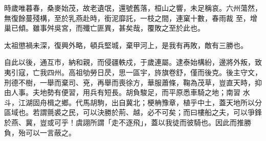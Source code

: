 \begin{pinyinscope}
 時歲唯暮春，桑麥始茂，故老遺氓，還號舊落，桓山之響，未足稱哀。六州蕩然，無復餘蔓殘構，至於乳燕赴時，銜泥靡託，一枝之間，連窠十數，春雨裁
 至，增巢已傾。雖事舛吳宮，而殲亡匪異，甚矣哉，覆敗之至於此也。



 太祖懲禍未深，復興外略，頓兵堅城，棄甲河上，是我有再敗，敵有三勝也。



 自此以後，通互市，納和親，而侵疆軼戍，于歲連屬。逮泰始構紛，邊將外叛，致夷引寇，亡我四州。高祖劬勞日昃，思一區宇，旍旗卷舒，僅而後克。後主守文，刑德不樹，一舉而棄司、兗，再舉而喪徐方，華服蕭條，鞠為茂草，豈直天時，抑由人事。夫地勢有便習，用兵有短長。胡負駿足，而平原悉車騎之地；南習
 水斗，江湖固舟楫之鄉。代馬胡駒，出自冀北；梗柟豫章，植乎中土，蓋天地所以分區域也。若謂氈裘之民，可以決勝於荊、越，必不可矣；而曰樓船之夫，可以爭鋒於燕、冀，豈或可乎！虞詡所謂「走不逐飛」，蓋以我徒而彼騎也。因此而推勝負，殆可以一言蔽之。



\end{pinyinscope}